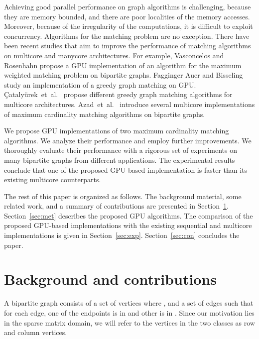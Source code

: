 \documentclass[11pt,a4paper]{article}
\begin{document}
Achieving good parallel performance on graph algorithms
is challenging, because they are memory bounded, and 
there are poor localities of the memory accesses. Moreover, because of 
the irregularity of the computations, it is difficult to exploit concurrency. 
Algorithms for the matching problem are no exception.
There have been recent studies that aim to improve the performance of 
matching algorithms on multicore and manycore architectures.
For example, Vasconcelos and Rosenhahn \cite{vasconcelos2009bipartite} propose
a GPU implementation of an algorithm for the maximum weighted matching problem on bipartite graphs. 
Fagginger Auer and Bisseling \cite{fagginger2012gpu} study 
an implementation of a greedy graph matching on GPU. 
\c{C}ataly\"{u}rek~et~al.~\cite{catalyurek2012multithreaded} propose
different greedy graph matching algorithms for multicore architectures. 
Azad~et~al.~\cite{ahrbka:12} 
introduce several multicore implementations of maximum cardinality matching 
algorithms on bipartite graphs. 

We propose GPU implementations of two maximum
cardinality matching algorithms. We analyze their
performance and employ further improvements. We thoroughly evaluate
their performance with a rigorous set of experiments on many bipartite
graphs from different applications. The experimental results
conclude that one of the proposed GPU-based implementation is faster than its
existing multicore counterparts.
 
The rest of this paper is organized as follows. The background
material, some related work, and a summary of contributions are presented in
Section~\ref{sec:back}. Section~\ref{sec:met} describes the proposed
GPU algorithms. The comparison of the proposed GPU-based
implementations with the existing sequential and multicore implementations
is given in
Section~\ref{sec:exp}. Section~\ref{sec:con} concludes the paper.

\vspace*{-1ex}
\section{Background and contributions}\label{sec:back}
\vspace*{-1ex}
A bipartite graph  consists of a set of vertices  where , 
and a set of edges  such that 
for each edge, one of the endpoints is in  and other is in .
Since our motivation lies in the sparse matrix domain, we will refer to the vertices in the two classes as row and column vertices.
\end{document}
